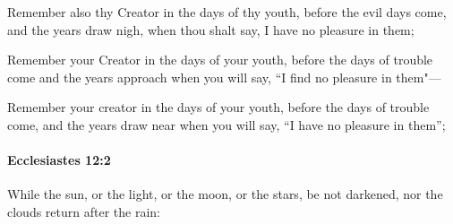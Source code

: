 			\begin{versebox}
					\item[BHS] 
					\item[LXX] 
					\item[ASV] Remember also thy Creator in the days of thy youth, before the evil days come, and the years draw nigh, when thou shalt say, I have no pleasure in them;
					\item[NIV] Remember your Creator in the days of your youth, before the days of trouble come and the years approach when you will say, “I find no pleasure in them"—
					\item[NRSV] Remember your creator in the days of your youth, before the days of trouble come, and the years draw near when you will say, “I have no pleasure in them”;
			\end{versebox}

		\paragraph{Ecclesiastes 12:2} %
			\label{ECCLESIASTES-12-2}

			While the sun, or the light, or the moon, or the stars, be not darkened, nor the clouds return after the rain:

